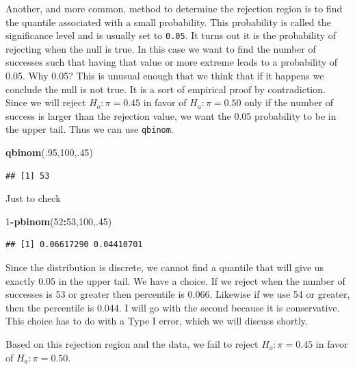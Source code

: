 \documentclass[]{book}
\newenvironment{Shaded}{\begin{snugshade}}{\end{snugshade}}
\newcommand{\KeywordTok}[1]{\textcolor[rgb]{0.13,0.29,0.53}{\textbf{#1}}}
\newcommand{\DecValTok}[1]{\textcolor[rgb]{0.00,0.00,0.81}{#1}}
\newcommand{\OperatorTok}[1]{\textcolor[rgb]{0.81,0.36,0.00}{\textbf{#1}}}
\newcommand{\NormalTok}[1]{#1}
\theoremstyle{definition}
\theoremstyle{definition}
\theoremstyle{definition}
\theoremstyle{remark}
\begin{document}
Another, and more common, method to determine the rejection region is to
find the quantile associated with a small probability. This probability
is called the significance level and is usually set to \texttt{0.05}. It
turns out it is the probability of rejecting when the null is true. In
this case we want to find the number of successes such that having that
value or more extreme leads to a probability of 0.05. Why 0.05? This is
unusual enough that we think that if it happens we conclude the null is
not true. It is a sort of empirical proof by contradiction. Since we
will reject \(H_{o}: \pi = 0.45\) in favor of \(H_{a}: \pi = 0.50\) only
if the number of success is larger than the rejection value, we want the
0.05 probability to be in the upper tail. Thus we can use
\texttt{qbinom}.

\begin{Shaded}
\begin{Highlighting}[]
\KeywordTok{qbinom}\NormalTok{(.}\DecValTok{95}\NormalTok{,}\DecValTok{100}\NormalTok{,.}\DecValTok{45}\NormalTok{)}
\end{Highlighting}
\end{Shaded}

\begin{verbatim}
## [1] 53
\end{verbatim}

Just to check

\begin{Shaded}
\begin{Highlighting}[]
\DecValTok{1}\OperatorTok{-}\KeywordTok{pbinom}\NormalTok{(}\DecValTok{52}\OperatorTok{:}\DecValTok{53}\NormalTok{,}\DecValTok{100}\NormalTok{,.}\DecValTok{45}\NormalTok{)}
\end{Highlighting}
\end{Shaded}

\begin{verbatim}
## [1] 0.06617290 0.04410701
\end{verbatim}

Since the distribution is discrete, we cannot find a quantile that will
give us exactly 0.05 in the upper tail. We have a choice. If we reject
when the number of successes is 53 or greater then percentile is 0.066.
Likewise if we use 54 or greater, then the percentile is 0.044. I will
go with the second because it is conservative. This choice has to do
with a Type I error, which we will discuss shortly.

Based on this rejection region and the data, we fail to reject
\(H_{o}: \pi = 0.45\) in favor of \(H_{a}: \pi = 0.50\).
\end{document}
